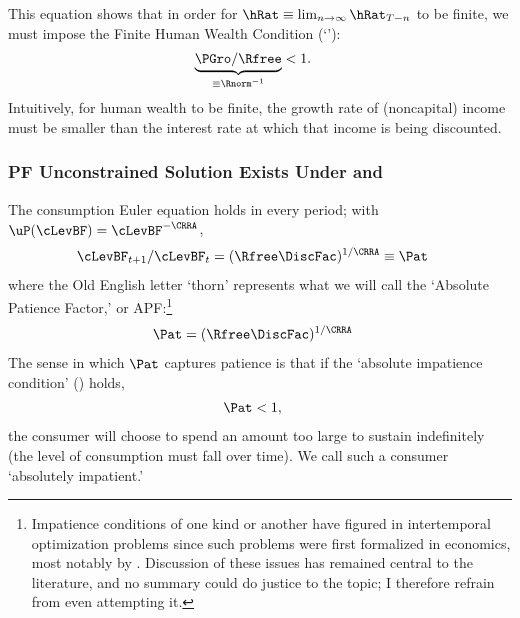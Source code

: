 \documentclass[BufferStockTheory]{subfiles}
\begin{document}
\hypertarget{FHWC}{}
This equation shows that in order for $\hRat \equiv \lim_{n \rightarrow
  \infty} \hRat_{T-n}$ to be finite, we must
impose the Finite Human Wealth Condition (`\FHWC'): 
\begin{align}
  \underbrace{\PGro/\Rfree}_{\equiv \Rnorm^{-1}}  & < 1 \label{eq:FHWC}.
\end{align}
Intuitively, for human wealth to be finite, the growth rate of (noncapital) income must be smaller than
the interest rate at which that income is being discounted.

\hypertarget{Unconstrained-Solution}{}
\hypertarget{PF-Unconstrained-Solution}{}
\subsubsection{PF Unconstrained Solution Exists Under {\RIC} and {\FHWC}} \label{subsec:PFUncon}

\hypertarget{APF}{}
\hypertarget{AIC}{}
The consumption Euler equation holds in every period; with $\uP(\cLevBF)=\cLevBF^{-\CRRA}$, \hypertarget{Pat}{}
\begin{align}
  \cLevBF_{t+1}/\cLevBF_{t}  & = (\Rfree\DiscFac)^{1/\CRRA} \equiv \Pat   \label{eq:Pat}
\end{align}
where the Old English letter `thorn' represents what we will call the
`Absolute Patience Factor,' or APF:\footnote{Impatience conditions of one kind or
  another have figured in intertemporal optimization problems since
  such problems were first formalized in economics, most notably by \cite{ramseySave}.
  Discussion of these issues has remained central to the literature, and no summary could do justice to the topic; I therefore refrain from even attempting it.}\
\begin{align}
  \Pat & = (\Rfree\DiscFac)^{1/\CRRA} \label{eq:APF}
\end{align}
The sense in which $\Pat$ captures
patience is that if the `absolute impatience condition' (\AIC) holds,
\begin{align}
  \label{eq:AIC}
  \Pat  & < 1,
\end{align}
the consumer will choose to spend an amount too large to sustain indefinitely (the
level of consumption must fall over time).  We call such a consumer `absolutely impatient.'\hypertarget{RPF}{}
\end{document}
